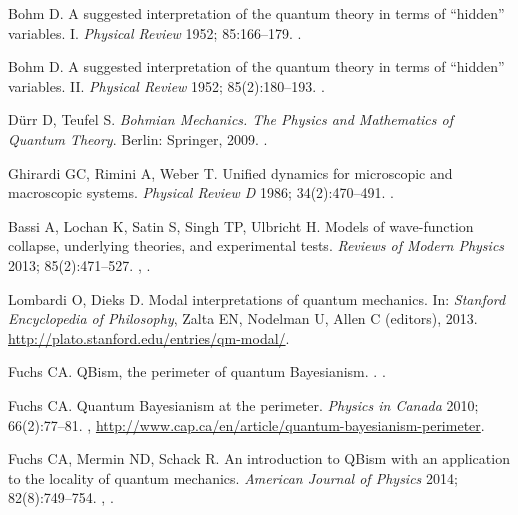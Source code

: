 \documentclass[DIV=calc,paper=a4,fontsize=11pt,twocolumn]{scrartcl} %
\theoremstyle{definition}
\theoremstyle{plain}
\begin{document}
\begin{thebibliography}{10}
Bohm D.
\newblock A suggested interpretation of the quantum theory in terms of ``hidden'' variables. I.
\newblock \emph{Physical Review} 1952; 85:166--179.
\newblock \href {http://dx.doi.org/10.1103/PhysRev.85.166}
{}.

Bohm D.
\newblock A suggested interpretation of the quantum theory in terms of ``hidden'' variables. II.
\newblock \emph{Physical Review} 1952; 85(2):180--193.
\newblock \href {http://dx.doi.org/10.1103/PhysRev.85.180}
{}.

D{\"u}rr D, Teufel S.
\newblock \emph{Bohmian Mechanics. The Physics and Mathematics of Quantum Theory}.
\newblock Berlin: Springer, 2009.
\newblock \href {http://dx.doi.org/10.1007/b99978}
{}.

Ghirardi GC, Rimini A, Weber T.
\newblock Unified dynamics for microscopic and macroscopic systems.
\newblock \emph{Physical Review D} 1986; 34(2):470--491.
\newblock \href {http://dx.doi.org/10.1103/PhysRevD.34.470}
{}.

Bassi A, Lochan K, Satin S, Singh TP, Ulbricht H.
\newblock Models of wave-function collapse, underlying theories, and experimental tests.
\newblock \emph{Reviews of Modern Physics} 2013; 85(2):471--527.
\newblock \href {http://arxiv.org/abs/1204.4325} {},
\href {http://dx.doi.org/10.1103/RevModPhys.85.471}
{}.

Lombardi O, Dieks D.
\newblock Modal interpretations of quantum mechanics.
\newblock In: \emph{Stanford Encyclopedia of Philosophy}, Zalta EN, Nodelman U, Allen C (editors), 2013.
\newblock \url{http://plato.stanford.edu/entries/qm-modal/}.

Fuchs CA.
\newblock QBism, the perimeter of quantum Bayesianism.
.
\newblock \href {http://arxiv.org/abs/1003.5209} {}.

Fuchs CA.
\newblock Quantum Bayesianism at the perimeter.
\newblock \emph{Physics in Canada} 2010; 66(2):77--81.
\newblock \href{http://arxiv.org/abs/1003.5182}{}, \url{http://www.cap.ca/en/article/quantum-bayesianism-perimeter}.

Fuchs CA, Mermin ND, Schack R.
\newblock An introduction to QBism with an application to the locality
of quantum mechanics.
\newblock \emph{American Journal of Physics} 2014; 82(8):749--754.
\newblock \href {http://arxiv.org/abs/1311.5253} {},
\href {http://dx.doi.org/10.1119/1.4874855}
{}.


\end{thebibliography}
\end{document}
